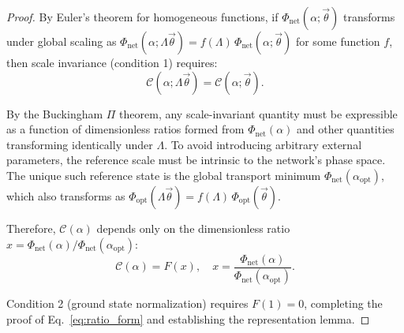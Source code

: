 \begin{proof}
By Euler's theorem for homogeneous functions, if $\Phi_{\mathrm{net}}(\alpha;
\vec{\theta})$ transforms under global scaling as $\Phi_{\mathrm{net}}(\alpha;
\Lambda\vec{\theta}) = f(\Lambda)\,\Phi_{\mathrm{net}}(\alpha; \vec{\theta})$
for some function $f$, then scale invariance (condition 1) requires:
\begin{equation}
    \mathcal{C}(\alpha; \Lambda\vec{\theta}) =
    \mathcal{C}(\alpha; \vec{\theta}).
\end{equation}

By the Buckingham $\Pi$ theorem, any scale-invariant quantity must be
expressible as a function of dimensionless ratios formed from
$\Phi_{\mathrm{net}}(\alpha)$ and other quantities transforming identically
under $\Lambda$. To avoid introducing arbitrary external parameters, the
reference scale must be intrinsic to the network's phase space. The unique such
reference state is the global transport minimum
$\Phi_{\mathrm{net}}(\alpha_{\mathrm{opt}})$, which also transforms as
$\Phi_{\mathrm{opt}}(\Lambda\vec{\theta}) =
f(\Lambda)\,\Phi_{\mathrm{opt}}(\vec{\theta})$.

Therefore, $\mathcal{C}(\alpha)$ depends only on the dimensionless ratio $x =
\Phi_{\mathrm{net}}(\alpha)/\Phi_{\mathrm{net}}(\alpha_{\mathrm{opt}})$:
\begin{equation}
    \mathcal{C}(\alpha) = F(x), \quad x = \frac{\Phi_{\mathrm{net}}(\alpha)}{\Phi_{\mathrm{net}}(\alpha_{\mathrm{opt}})}.
    \label{eq:ratio_form}
\end{equation}

Condition 2 (ground state normalization) requires $F(1) = 0$, completing the
proof of Eq.~\eqref{eq:ratio_form} and establishing the representation lemma.
\end{proof}

